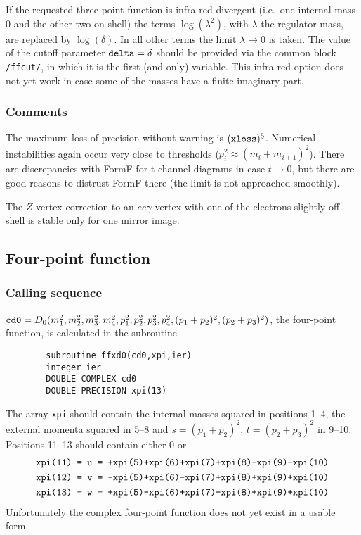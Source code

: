 If the requested three-point function is infra-red divergent (i.e.\ one 
internal mass 0 and the other two on-shell) the terms $\log(\lambda^2)$, with
$\lambda$ the regulator mass, are replaced by $\log(\delta)$.  In all other 
terms the limit $\lambda \to 0$ is taken.  The value of the cutoff parameter 
$\mbox{\tt delta} = \delta$ should be provided via the common block {\tt 
/ffcut/}, in which it is the first (and only) variable.  This infra-red option 
does not yet work in case some of the masses have a finite imaginary part.

\subsubsection{Comments}

The maximum loss of precision without warning is $(\mbox{\tt xloss})^5$.  
Numerical instabilities again occur very close to thresholds ($p_i^2 \approx 
(m_i + m_{i+1})^2$).  There are discrepancies with FormF for t-channel 
diagrams in case $t \to 0$, but there are good reasons to distrust FormF 
there (the limit is not approached smoothly).

The $Z$ vertex correction to an $ee\gamma$ vertex with one of the electrons 
slightly off-shell is stable only for one mirror image.

\subsection{Four-point function}

\subsubsection{Calling sequence}

$\mbox{\tt cd0} = D_0(m_1^2,m_2^2,m_3^2,m_4^2,
p_1^2,p_2^2,p_3^2,p_4^2,(p_1+p_2)^2,(p_2+p_3)^2)$, the four-point function, is 
calculated in the subroutine
\begin{verbatim}
        subroutine ffxd0(cd0,xpi,ier)
        integer ier
        DOUBLE COMPLEX cd0
        DOUBLE PRECISION xpi(13)
\end{verbatim}
The array {\tt xpi} should contain the internal masses squared in positions 
1--4, the external momenta squared in 5--8 and $s = (p_1+p_2)^2$, $t = 
(p_2+p_3)^2$ in 9--10.  Positions 11--13 should contain either 0 or 
\begin{eqnarray}
    \mbox{\tt xpi(11) = u = +xpi(5)+xpi(6)+xpi(7)+xpi(8)-xpi(9)-xpi(10)}\nonumber\\
    \mbox{\tt xpi(12) = v = -xpi(5)+xpi(6)-xpi(7)+xpi(8)+xpi(9)+xpi(10)}\nonumber\\
    \mbox{\tt xpi(13) = w = +xpi(5)-xpi(6)+xpi(7)-xpi(8)+xpi(9)+xpi(10)}\nonumber
\end{eqnarray}
Unfortunately the complex four-point function does not yet exist in a usable 
form.

